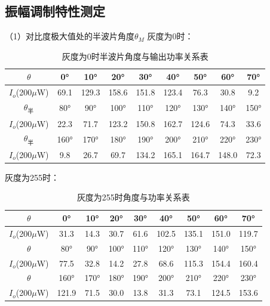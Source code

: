 \documentclass[11pt,a4paper]{article}
\begin{document}
\subsection{振幅调制特性测定}
（1）对比度极大值处的半波片角度$\theta_M$
灰度为0时：
\begin{table}[H]
    \centering
    \begin{tabular}{|c|c|c|c|c|c|c|c|c|}
    \hline
    $\theta$ & 0° & 10° & 20° & 30° & 40° & 50° & 60° & 70° \\
    \hline
    $I_o$(200$\mu$W) & 69.1 & 129.3 & 158.6 & 151.8 & 123.4 & 76.3 & 30.8 & 9.2 \\
    \hline
    $\theta_{半}$ & 80° & 90° & 100° & 110° & 120° & 130° & 140° & 150° \\
    \hline
    $I_o$(200$\mu$W) & 22.3 & 71.7 & 123.2 & 150.8 & 162.7 & 124.6 & 74.3 & 33.6 \\
    \hline
    $\theta_{半}$ & 160° & 170° & 180° & 190° & 200° & 210° & 220° & 230° \\
    \hline
    $I_o$(200$\mu$W) & 9.8 & 26.7 & 69.7 & 134.2 & 165.1 & 164.7 & 148.0 & 72.3 \\
    \hline
    \end{tabular}
    \caption{灰度为0时半波片角度与输出功率关系表}
    \label{tab:half-wave-plate}
    \end{table}
灰度为255时：
    \begin{table}[H]
        \centering
        \begin{tabular}{|c|c|c|c|c|c|c|c|c|}
        \hline
        $\theta$ & 0° & 10° & 20° & 30° & 40° & 50° & 60° & 70° \\
        \hline
        $I_o$(200$\mu$W) & 31.3 & 14.3 & 30.7 & 61.6 & 102.5 & 135.1 & 151.0 & 119.7 \\
        \hline
        $\theta$ & 80° & 90° & 100° & 110° & 120° & 130° & 140° & 150° \\
        \hline
        $I_o$(200$\mu$W) & 77.5 & 32.8 & 14.2 & 27.8 & 68.6 & 115.3 & 154.4 & 160.4 \\
        \hline
        $\theta$ & 160° & 170° & 180° & 190° & 200° & 210° & 220° & 230° \\
        \hline
        $I_o$(200$\mu$W) & 121.9 & 71.5 & 30.0 & 13.8 & 31.3 & 73.1 & 124.5 & 153.6 \\
        \hline
        \end{tabular}
        \caption{灰度为255时角度与功率关系表}
        \label{tab:angle-power-relation}
        \end{table}
\end{document}
